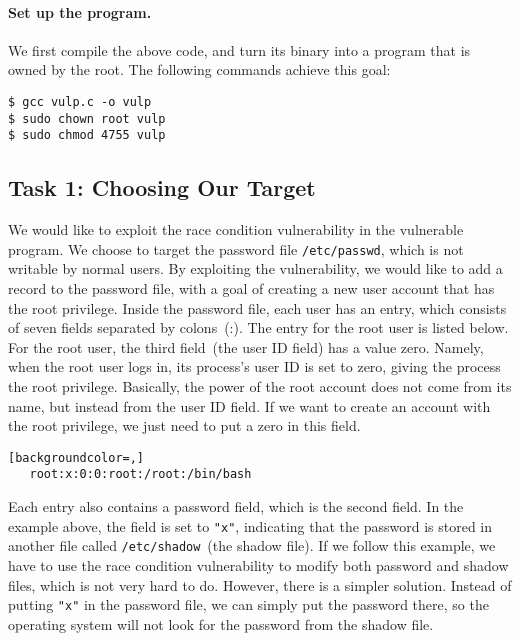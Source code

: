 \paragraph{Set up the \setuid program.}
We first compile the above code, and turn its binary into a \setuid program that is owned by the
root. The following commands achieve this goal:

\begin{lstlisting}
$ gcc vulp.c -o vulp
$ sudo chown root vulp
$ sudo chmod 4755 vulp
\end{lstlisting}



\subsection{Task 1: Choosing Our Target}

We would like to exploit the race condition vulnerability in
the vulnerable program.
We choose to target the password file \texttt{/etc/passwd}, which is not writable by
normal users. By exploiting the vulnerability, we would like to
add a record to the password file, with a goal of
creating a new user account that has the root privilege.
Inside the password file, each user has an entry, which consists of seven fields
separated by colons~(:). The entry for the root user is listed below.
For the root user, the third field~(the user ID field) has a value zero. Namely, when the root
user logs in, its process's user ID is set to zero, giving the process the root privilege.
Basically, the power of the root account does not come from its name, but instead from
the user ID field. If we want to create an account with the root privilege,
we just need to put a zero in this field.

\begin{lstlisting}[backgroundcolor=,]
   root:x:0:0:root:/root:/bin/bash
\end{lstlisting}

Each entry also contains a password field, which is the second field. In the example above, the
field is set to \texttt{"x"}, indicating that the password is stored in another file called
\texttt{/etc/shadow}~(the shadow file). If we follow this example, we have to use the race condition
vulnerability to modify both password and shadow files, which is not
very hard to do. However, there is a simpler solution. Instead of putting \texttt{"x"} in the
password file, we can simply put the password there, so the operating system will not look for
the password from the shadow file.


